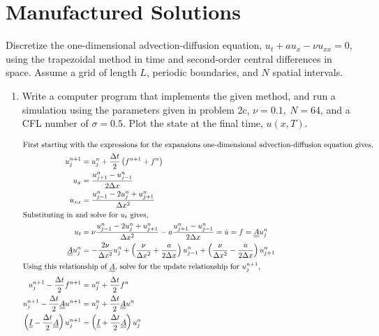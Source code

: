 \pagebreak
\section{Manufactured Solutions}
Discretize the one-dimensional advection-diffusion equation, $u_t + au_x - \nu u_{xx}= 0$, using the trapezoidal method in time and second-order central differences in space. Assume a grid of length $L$, periodic boundaries, and $N$ spatial intervals.


\begin{enumerate}[label=\alph*., start = 1]
    \item Write a computer program that implements the given method, and run a simulation using the parameters given in problem 2c, $\nu= 0.1,\ N= 64$, and a CFL number of $\sigma= 0.5$.  Plot the state at the final time, $u(x,T)$.
    
    \begin{align*}
        \shortintertext{First starting with the expressions for the expansions one-dimensional advection-diffusion equation gives,}
        u_{j}^{n+1} & = u_j^n + \frac{\Delta t}{2}\left(f^{n+1} + f^n\right)\\
        u_x & = \frac{u_{j+1}^n - u_{j-1}^n}{2\Delta x}\\
        u_{xx} & = \frac{u_{j-1}^n - 2u_{j}^n + u_{j+1}^n}{\Delta x^2}\\
        \shortintertext{Substituting in and solve for $u_t$ gives,}
        u_t & = \nu \frac{u_{j-1}^n - 2u_{j}^n + u_{j+1}^n}{\Delta x^2} - a\frac{u_{j+1}^n - u_{j-1}^n}{2\Delta x} = \dot{u} = f = \underline{\underline{A}}u_j^n\\
        \underline{\underline{A}}u_j^n & = -\frac{2\nu}{\Delta x^2}u_j^n + \left(\frac{\nu}{\Delta x^2} + \frac{a}{2\Delta x}\right)u_{j-1}^n + \left(\frac{\nu}{\Delta x^2} - \frac{a}{2\Delta x}\right)u_{j+1}^n\\
        \shortintertext{Using this relationship of $\underline{\underline{A}}$, solve for the update relationship for $u^{n+1}_j$,}
        u_j^{n+1} - \frac{\Delta t}{2}f^{n+1} & = u_j^{n} + \frac{\Delta t}{2}f^{n} \\
        u_j^{n+1} - \frac{\Delta t}{2}\underline{\underline{A}}u^{n+1} & = u_j^{n} + \frac{\Delta t}{2}\underline{\underline{A}}u^{n} \\
        \left(\underline{\underline{I}} - \frac{\Delta t}{2}\underline{\underline{A}}\right)u_j^{n+1} & = \left(\underline{\underline{I}} + \frac{\Delta t}{2}\underline{\underline{A}}\right)u_j^{n}\\
    \end{align*}


\end{enumerate}

